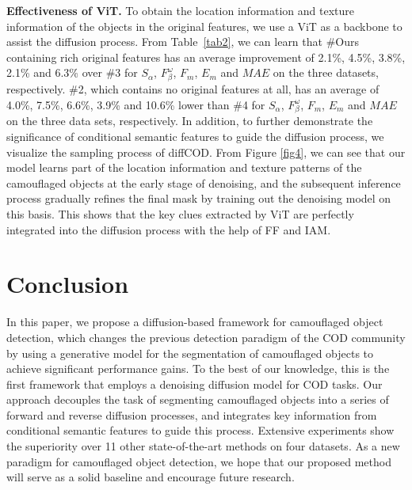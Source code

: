 \documentclass{ecai}
\begin{document}
\vspace{5mm}
\noindent\textbf{Effectiveness of ViT.}
To obtain the location information and texture information of the objects in the original features, we use a ViT as a backbone to assist the diffusion process. From Table~\ref{tab2}, we can learn that \#Ours containing rich original features has an average improvement of 2.1\%, 4.5\%, 3.8\%, 2.1\% and 6.3\% over \#3 for $S_{\alpha}$, $F_{\beta}^{\omega}$, $F_{m}$, $E_{m}$ and $MAE$ on the three datasets, respectively. \#2, which contains no original features at all, has an average of 4.0\%, 7.5\%, 6.6\%, 3.9\% and 10.6\% lower than \#4 for $S_{\alpha}$, $F_{\beta}^{\omega}$, $F_{m}$, $E_{m}$ and $MAE$ on the three data sets, respectively. 
In addition, to further demonstrate the significance of conditional semantic features to guide the diffusion process, we visualize the sampling process of diffCOD. From Figure \ref{fig4}, we can see that our model learns part of the location information and texture patterns of the camouflaged objects at the early stage of denoising, and the subsequent inference process gradually refines the final mask by training out the denoising model on this basis. This shows that the key clues extracted by ViT are perfectly integrated into the diffusion process with the help of FF and IAM.



\vspace{2.2mm}
\section{Conclusion}
In this paper, we propose a diffusion-based framework for camouflaged object detection, which changes the previous detection paradigm of the COD community by using a generative model for the segmentation of camouflaged objects to achieve significant performance gains. To the best of our knowledge, this is the first framework that employs a denoising diffusion model for COD tasks. Our approach decouples the task of segmenting camouflaged objects into a series of forward and reverse diffusion processes, and integrates key information from conditional semantic features to guide this process. Extensive experiments show the superiority over 11 other state-of-the-art methods on four datasets. 
As a new paradigm for camouflaged object detection, we hope that our proposed method will serve as a solid baseline and encourage future research. 

\newpage

\end{document}
